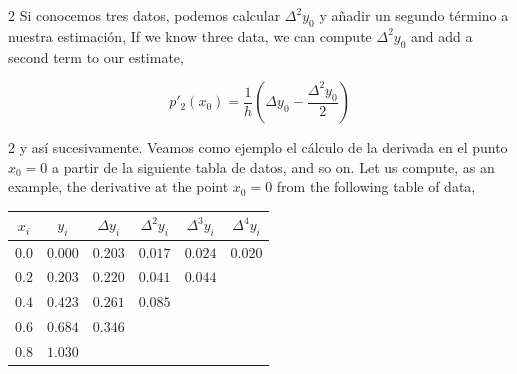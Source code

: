 \begin{paracol}{2}
Si conocemos tres datos, podemos calcular $\Delta^2y_0$ y añadir un segundo término a nuestra estimación,
\switchcolumn
If we know three data, we can compute $\Delta^2y_0$ and add a second term to our estimate,
\end{paracol}
\begin{equation*}
p'_2(x_0)=\frac{1}{h}\left(\Delta y_0-\frac{\Delta^2 y_0}{2}\right)
\end{equation*}
\begin{paracol}{2}
y así sucesivamente. Veamos como ejemplo el cálculo de la derivada en el punto $x_0=0$ a partir de la siguiente tabla de datos,
\switchcolumn
and so on. Let us compute, as an example, the derivative at the point $x_0 =0$ from the following table of data,
\end{paracol}
\begin{table}[h]
\centering
\begin{tabular}{cccccc}
$x_i$&$y_i$&$\Delta y_i$&$\Delta^2 y_i$&$\Delta^3 y_i$ & $\Delta^4 y_i$\\
\hline
$0.0$& $0.000$& $0.203$ &$0.017$ &$0.024$ &$0.020$\\
$0.2$ &$0.203$ &$0.220$ &$0.041$ &$0.044$\\
$0.4$ &$0.423$ &$0.261$ &$0.085$\\
$0.6$ &$0.684$ &$0.346$\\
$0.8$ &$1.030$\\
\end{tabular}
\end{table}


